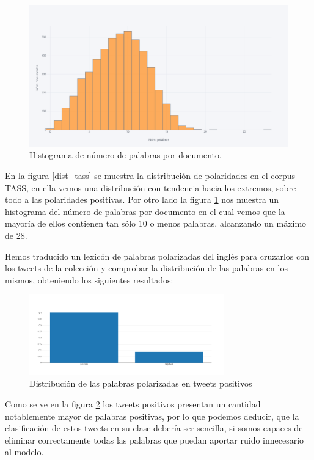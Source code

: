 \begin{figure}[!ht]
	\centering
	\includegraphics[width=1\textwidth]{imaxes/distTokensTass.png}
	\caption{Histograma de número de palabras por documento.}
	\label{dist_tokes_tass}
\end{figure}

En la figura \ref{dist_tass} se muestra la distribución de polaridades en el corpus TASS, en ella vemos una distribución con tendencia hacia los extremos, sobre todo a las polaridades positivas. Por otro lado la figura \ref{dist_tokes_tass} nos muestra un histograma del número de palabras por documento en el cual vemos que la mayoría de ellos contienen tan sólo 10 o menos palabras, alcanzando un máximo de 28.

Hemos traducido un lexicón de palabras polarizadas del inglés para cruzarlos con los tweets de la colección y comprobar la distribución de las palabras en los mismos, obteniendo los siguientes resultados:

\begin{figure}[H]
	\centering
	\includegraphics[width=0.75\textwidth]{imaxes/dist_pos_neg.png}
	\caption{Distribución de las palabras polarizadas en tweets positivos}
	\label{dist_pos}
\end{figure}

Como se ve en la figura \ref{dist_pos} los tweets positivos presentan un cantidad notablemente mayor de palabras positivas, por lo que podemos deducir, que la clasificación de estos tweets en su clase debería ser sencilla, si somos capaces de eliminar correctamente todas las palabras que puedan aportar ruido innecesario al modelo.

